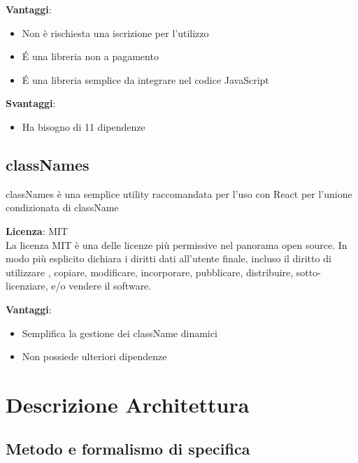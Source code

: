 \textbf{Vantaggi}: 
\begin{itemize}
	\item Non è rischiesta una iscrizione per l'utilizzo
	\item \'E una libreria non a pagamento
	\item \'E una libreria semplice da integrare nel codice JavaScript
\end{itemize}

\textbf{Svantaggi}: 
\begin{itemize}
	\item Ha bisogno di 11 dipendenze 
\end{itemize}


\subsection{classNames}

classNames è una semplice utility raccomandata per l'uso con React per l'unione condizionata di className

\textbf{Licenza}: MIT \\
La licenza MIT è una delle licenze più permissive nel panorama open source. In modo più esplicito dichiara i diritti dati all'utente finale, incluso il diritto di utilizzare , copiare, modificare, incorporare, pubblicare, distribuire, sotto-licenziare, e/o vendere il software.

\textbf{Vantaggi}: 
\begin{itemize}
	\item Semplifica la gestione dei className dinamici 
	\item Non possiede ulteriori dipendenze 
\end{itemize}





\section{Descrizione Architettura}
\subsection{Metodo e formalismo di specifica}

